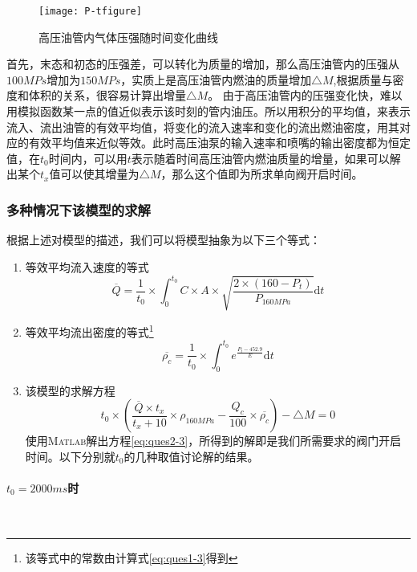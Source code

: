 \documentclass{cumcmthesis}
\begin{document}
\begin{figure}[!h]
	\centering 
	\texttt{[image: P-tfigure]}
	\caption{高压油管内气体压强随时间变化曲线}
	\label{fig:f(t)-picture}
\end{figure}
\newpage
首先，末态和初态的压强差，可以转化为质量的增加，那么高压油管内的压强从${100MPs}$增加为${150MPs}$，实质上是高压油管内燃油的质量增加${\triangle M}$,根据质量与密度和体积的关系，很容易计算出增量${\triangle M}$。
由于高压油管内的压强变化快，难以用模拟函数某一点的值近似表示该时刻的管内油压。所以用积分的平均值，来表示流入、流出油管的有效平均值，将变化的流入速率和变化的流出燃油密度，用其对应的有效平均值来近似等效。此时高压油泵的输入速率和喷嘴的输出密度都为恒定值，在$t_{0}$时间内，可以用$t$表示随着时间高压油管内燃油质量的增量，如果可以解出某个$t_{x}$值可以使其增量为${\triangle M}$，那么这个值即为所求单向阀开启时间。
\subsubsection{多种情况下该模型的求解}
根据上述对模型的描述，我们可以将模型抽象为以下三个等式：
\begin{enumerate}
	\item 等效平均流入速度的等式
	\begin{equation*}
	\overline{Q} = \frac{1}{t_{0}}\times \int_{0}^{t_{0}} C\times A\times \sqrt{\frac{2\times (160-P_{t})}{P_{160MPa}}}{\text{d}t}\label{eq:ques2-1}	
	\end{equation*}
	\item 等效平均流出密度的等式\footnote{该等式中的常数由计算式\cref{eq:ques1-3}得到}
	\begin{equation*}
	\overline{\rho_{c}} = \frac{1}{t_{0}}\times \int_{0}^{t_{0}} e^{\frac{P_{t}-452.9}{E}}{\text{d}t}\label{eq:ques2-2}	
	\end{equation*}
	\item 该模型的求解方程
	\begin{equation}
	t_{0}\times(\frac{\overline{Q}\times t_{x}}{t_{x}+10}\times \rho_{160MPa}-\frac{Q_{c}}{100}\times \overline{\rho_{c}})-\triangle M = 0\label{eq:ques2-3}	
	\end{equation}
	使用\textsc{Matlab}解出方程\cref{eq:ques2-3}，所得到的解即是我们所需要求的阀门开启时间。以下分别就$t_{0}$的几种取值讨论解的结果。
\end{enumerate}
\paragraph{$t_{0}=2000ms$时}~{}
\end{document}
